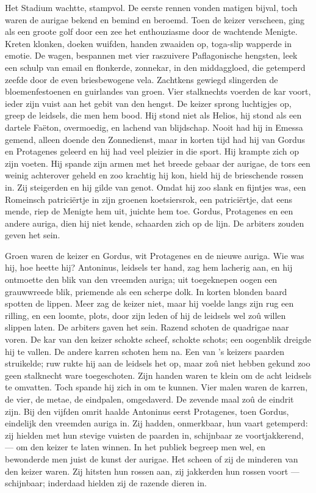 \documentclass[a4paper, 12pt, oneside, dutch]{article}
\begin{document}
Het Stadium wachtte, stampvol. De eerste rennen vonden matigen bijval, toch waren de aurigae bekend en bemind en beroemd. Toen de keizer verscheen, ging als een groote golf door een zee het enthouziasme door de wachtende Menigte. Kreten klonken, doeken wuifden, handen zwaaiden op, toga-slip wapperde in emotie. De wagen, bespannen met vier raszuivere Paflagonische hengsten, leek een schulp van email en flonkerde, zonnekar, in den middaggloed, die getemperd zeefde door de even briesbewogene vela. Zachtkens gewiegd slingerden de bloemenfestoenen en guirlandes van groen. Vier stalknechts voerden de kar voort, ieder zijn vuist aan het gebit van den hengst. De keizer sprong luchtigjes op, greep de leidsels, die men hem bood. Hij stond niet als Helios, hij stond als een dartele Faëton, overmoedig, en lachend van blijdschap. Nooit had hij in Emessa gemend, alleen doende den Zonnedienst, maar in korten tijd had hij van Gordus en Protagenes geleerd en hij had veel pleizier in die sport. Hij krampte zich op zijn voeten. Hij spande zijn armen met het breede gebaar der aurigae, de tors een weinig achterover geheld en zoo krachtig hij kon, hield hij de brieschende rossen in. Zij steigerden en hij gilde van genot. Omdat hij zoo slank en fijntjes was, een Romeinsch patriciërtje in zijn groenen koetsiersrok, een patriciërtje, dat eens mende, riep de Menigte hem uit, juichte hem toe. Gordus, Protagenes en een andere auriga, dien hij niet kende, schaarden zich op de lijn. De arbiters zouden geven het sein.

Groen waren de keizer en Gordus, wit Protagenes en de nieuwe auriga. Wie was hij, hoe heette hij? Antoninus, leidsels ter hand, zag hem lacherig aan, en hij ontmoette den blik van den vreemden auriga; uit toegeknepen oogen een grauwwreede blik, priemende als een scherpe dolk. In korten blonden baard spotten de lippen. Meer zag de keizer niet, maar hij voelde langs zijn rug een rilling, en een loomte, plots, door zijn leden of hij de leidsels wel zoû willen slippen laten. De arbiters gaven het sein. Razend schoten de quadrigae naar voren. De kar van den keizer schokte scheef, schokte schots; een oogenblik dreigde hij te vallen. De andere karren schoten hem na. Een van 's keizers paarden struikelde; ruw rukte hij aan de leidsels het op, maar zoû niet hebben gekund zoo geen stalknecht ware toegeschoten. Zijn handen waren te klein om de acht leidsels te omvatten. Toch spande hij zich in om te kunnen. Vier malen waren de karren, de vier, de metae, de eindpalen, omgedaverd. De zevende maal zoû de eindrit zijn. Bij den vijfden omrit haalde Antoninus eerst Protagenes, toen Gordus, eindelijk den vreemden auriga in. Zij hadden, onmerkbaar, hun vaart getemperd: zij hielden met hun stevige vuisten de paarden in, schijnbaar ze voortjakkerend, --- om den keizer te laten winnen. In het publiek begreep men wel, en bewonderde men juist de kunst der aurigae. Het scheen of zij de minderen van den keizer waren. Zij hitsten hun rossen aan, zij jakkerden hun rossen voort --- schijnbaar; inderdaad hielden zij de razende dieren in.
\end{document}
